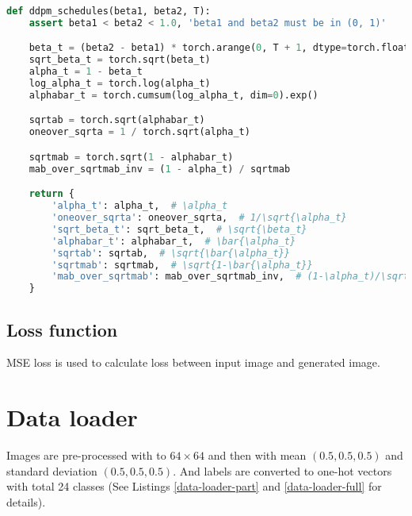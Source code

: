 \begin{lstlisting}[language=Python, caption={Python code of \textcolor{blue}{\textbf{ddpm\_schedules}} of DDPM.}, label={ddpm-schedule}]
def ddpm_schedules(beta1, beta2, T):
    assert beta1 < beta2 < 1.0, 'beta1 and beta2 must be in (0, 1)'

    beta_t = (beta2 - beta1) * torch.arange(0, T + 1, dtype=torch.float32) / T + beta1
    sqrt_beta_t = torch.sqrt(beta_t)
    alpha_t = 1 - beta_t
    log_alpha_t = torch.log(alpha_t)
    alphabar_t = torch.cumsum(log_alpha_t, dim=0).exp()

    sqrtab = torch.sqrt(alphabar_t)
    oneover_sqrta = 1 / torch.sqrt(alpha_t)

    sqrtmab = torch.sqrt(1 - alphabar_t)
    mab_over_sqrtmab_inv = (1 - alpha_t) / sqrtmab

    return {
        'alpha_t': alpha_t,  # \alpha_t
        'oneover_sqrta': oneover_sqrta,  # 1/\sqrt{\alpha_t}
        'sqrt_beta_t': sqrt_beta_t,  # \sqrt{\beta_t}
        'alphabar_t': alphabar_t,  # \bar{\alpha_t}
        'sqrtab': sqrtab,  # \sqrt{\bar{\alpha_t}}
        'sqrtmab': sqrtmab,  # \sqrt{1-\bar{\alpha_t}}
        'mab_over_sqrtmab': mab_over_sqrtmab_inv,  # (1-\alpha_t)/\sqrt{1-\bar{\alpha_t}}
    }\end{lstlisting}

\subsection{Loss function}
\indent
    MSE loss is used to calculate loss between input image and generated image.

\section{Data loader}
\indent
    Images are pre-processed with  to $64 \times 64$ and then 
     with mean $(0.5, 0.5, 0.5)$ and standard deviation $(0.5, 0.5, 0.5)$. And
    labels are converted to one-hot vectors with total 24 classes (See Listings \ref{data-loader-part} and \ref{data-loader-full} for details).

